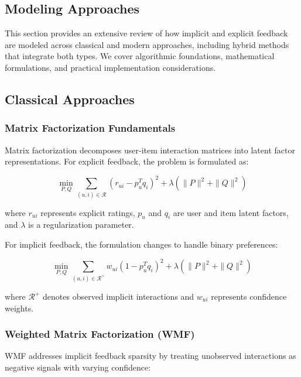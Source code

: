 \subsection{Modeling Approaches}
\label{subsec:modeling}

This section provides an extensive review of how implicit and explicit feedback are modeled across classical and modern approaches, including hybrid methods that integrate both types. We cover algorithmic foundations, mathematical formulations, and practical implementation considerations.

\subsection{Classical Approaches}

\subsubsection{Matrix Factorization Fundamentals}

Matrix factorization decomposes user-item interaction matrices into latent factor representations. For explicit feedback, the problem is formulated as:

\begin{equation}
\min_{P,Q} \sum_{(u,i) \in \mathcal{R}} (r_{ui} - p_u^T q_i)^2 + \lambda (\|P\|^2 + \|Q\|^2)
\label{eq:explicit_mf}
\end{equation}

where $r_{ui}$ represents explicit ratings, $p_u$ and $q_i$ are user and item latent factors, and $\lambda$ is a regularization parameter.

For implicit feedback, the formulation changes to handle binary preferences:

\begin{equation}
\min_{P,Q} \sum_{(u,i) \in \mathcal{R}^+} w_{ui} (1 - p_u^T q_i)^2 + \lambda (\|P\|^2 + \|Q\|^2)
\label{eq:implicit_mf}
\end{equation}

where $\mathcal{R}^+$ denotes observed implicit interactions and $w_{ui}$ represents confidence weights.

\subsubsection{Weighted Matrix Factorization (WMF)}

WMF addresses implicit feedback sparsity by treating unobserved interactions as negative signals with varying confidence:

